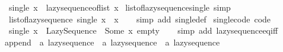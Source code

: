 \begin{isabellebody}
\ \ {\isachardoublequoteopen}single\ x\ {\isacharequal}{\kern0pt}\ lazy{\isacharunderscore}{\kern0pt}sequence{\isacharunderscore}{\kern0pt}of{\isacharunderscore}{\kern0pt}list\ {\isacharbrackleft}{\kern0pt}x{\isacharbrackright}{\kern0pt}{\isachardoublequoteclose}\isanewline
\isanewline
{}\isamarkupfalse%
\ list{\isacharunderscore}{\kern0pt}of{\isacharunderscore}{\kern0pt}lazy{\isacharunderscore}{\kern0pt}sequence{\isacharunderscore}{\kern0pt}single\ {\isacharbrackleft}{\kern0pt}simp{\isacharbrackright}{\kern0pt}{\isacharcolon}{\kern0pt}\isanewline
\ \ {\isachardoublequoteopen}list{\isacharunderscore}{\kern0pt}of{\isacharunderscore}{\kern0pt}lazy{\isacharunderscore}{\kern0pt}sequence\ {\isacharparenleft}{\kern0pt}single\ x{\isacharparenright}{\kern0pt}\ {\isacharequal}{\kern0pt}\ {\isacharbrackleft}{\kern0pt}x{\isacharbrackright}{\kern0pt}{\isachardoublequoteclose}\isanewline
%
\isadelimproof
\ \ %
\endisadelimproof
%
\isatagproof
{}\isamarkupfalse%
\ {\isacharparenleft}{\kern0pt}simp\ add{\isacharcolon}{\kern0pt}\ single{\isacharunderscore}{\kern0pt}def{\isacharparenright}{\kern0pt}%
\endisatagproof
{\isafoldproof}%
%
\isadelimproof
\isanewline
%
\endisadelimproof
\isanewline
{}\isamarkupfalse%
\ single{\isacharunderscore}{\kern0pt}code\ {\isacharbrackleft}{\kern0pt}code{\isacharbrackright}{\kern0pt}{\isacharcolon}{\kern0pt}\isanewline
\ \ {\isachardoublequoteopen}single\ x\ {\isacharequal}{\kern0pt}\ Lazy{\isacharunderscore}{\kern0pt}Sequence\ {\isacharparenleft}{\kern0pt}{\isasymlambda}{\isacharunderscore}{\kern0pt}{\isachardot}{\kern0pt}\ Some\ {\isacharparenleft}{\kern0pt}x{\isacharcomma}{\kern0pt}\ empty{\isacharparenright}{\kern0pt}{\isacharparenright}{\kern0pt}{\isachardoublequoteclose}\isanewline
%
\isadelimproof
\ \ %
\endisadelimproof
%
\isatagproof
{}\isamarkupfalse%
\ {\isacharparenleft}{\kern0pt}simp\ add{\isacharcolon}{\kern0pt}\ lazy{\isacharunderscore}{\kern0pt}sequence{\isacharunderscore}{\kern0pt}eq{\isacharunderscore}{\kern0pt}iff{\isacharparenright}{\kern0pt}%
\endisatagproof
{\isafoldproof}%
%
\isadelimproof
\isanewline
%
\endisadelimproof
\isanewline
{}\isamarkupfalse%
\ append\ {\isacharcolon}{\kern0pt}{\isacharcolon}{\kern0pt}\ {\isachardoublequoteopen}{\isacharprime}{\kern0pt}a\ lazy{\isacharunderscore}{\kern0pt}sequence\ {\isasymRightarrow}\ {\isacharprime}{\kern0pt}a\ lazy{\isacharunderscore}{\kern0pt}sequence\ {\isasymRightarrow}\ {\isacharprime}{\kern0pt}a\ lazy{\isacharunderscore}{\kern0pt}sequence{\isachardoublequoteclose}\isanewline
{}\isanewline

\end{isabellebody}
